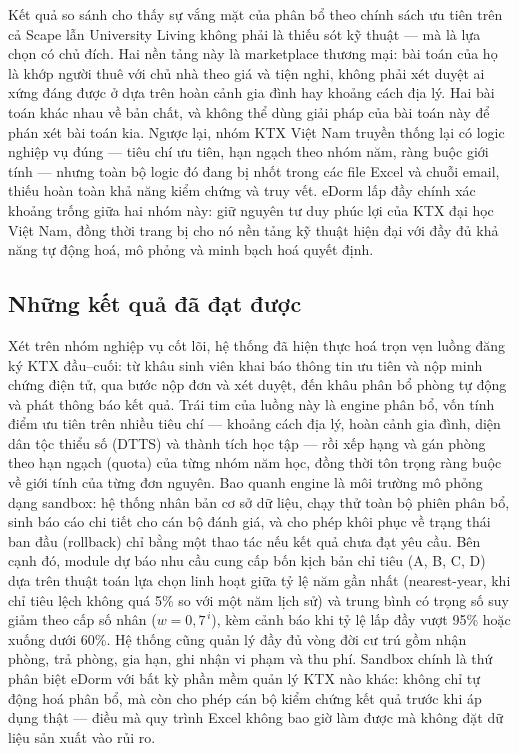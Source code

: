 \documentclass[../DoAn.tex]{subfiles}
\begin{document}
Kết quả so sánh cho thấy sự vắng mặt của phân bổ theo chính sách ưu tiên trên
cả Scape lẫn University Living không phải là thiếu sót kỹ thuật --- mà là lựa
chọn có chủ đích. Hai nền tảng này là marketplace thương mại: bài toán của họ
là khớp người thuê với chủ nhà theo giá và tiện nghi, không phải xét duyệt
ai xứng đáng được ở dựa trên hoàn cảnh gia đình hay khoảng cách địa lý. Hai bài
toán khác nhau về bản chất, và không thể dùng giải pháp của bài toán này để phán
xét bài toán kia. Ngược lại, nhóm KTX Việt Nam truyền thống lại có logic nghiệp
vụ đúng --- tiêu chí ưu tiên, hạn ngạch theo nhóm năm, ràng buộc giới tính ---
nhưng toàn bộ logic đó đang bị nhốt trong các file Excel và chuỗi email, thiếu
hoàn toàn khả năng kiểm chứng và truy vết. eDorm lấp đầy chính xác khoảng
trống giữa hai nhóm này: giữ nguyên tư duy phúc lợi của KTX đại học Việt Nam,
đồng thời trang bị cho nó nền tảng kỹ thuật hiện đại với đầy đủ khả năng tự
động hoá, mô phỏng và minh bạch hoá quyết định.

\subsection{Những kết quả đã đạt được}
\label{subsection:6.1.2}

Xét trên nhóm nghiệp vụ cốt lõi, hệ thống đã hiện thực hoá trọn vẹn luồng
đăng ký KTX đầu--cuối: từ khâu sinh viên khai báo thông tin ưu tiên và nộp
minh chứng điện tử, qua bước nộp đơn và xét duyệt, đến khâu phân bổ phòng tự
động và phát thông báo kết quả. Trái tim của luồng này là engine phân bổ, vốn
tính điểm ưu tiên trên nhiều tiêu chí --- khoảng cách địa lý, hoàn cảnh gia
đình, diện dân tộc thiểu số (DTTS) và thành tích học tập --- rồi xếp hạng và
gán phòng theo hạn ngạch (quota) của từng nhóm năm học, đồng thời tôn trọng
ràng buộc về giới tính của từng đơn nguyên. Bao quanh engine là môi trường mô
phỏng dạng sandbox: hệ thống nhân bản cơ sở dữ liệu, chạy thử toàn bộ phiên
phân bổ, sinh báo cáo chi tiết cho cán bộ đánh giá, và cho phép khôi phục về
trạng thái ban đầu (rollback) chỉ bằng một thao tác nếu kết quả chưa đạt yêu
cầu. Bên cạnh đó, module dự báo nhu cầu cung cấp bốn kịch bản chỉ tiêu (A, B,
C, D) dựa trên thuật toán lựa chọn linh hoạt giữa tỷ lệ năm gần nhất
(nearest-year, khi chỉ tiêu lệch không quá 5\% so với một năm lịch sử) và
trung bình có trọng số suy giảm theo cấp số nhân ($w = 0{,}7^{\,i}$), kèm
cảnh báo khi tỷ lệ lấp đầy vượt 95\% hoặc xuống dưới 60\%. Hệ thống cũng
quản lý đầy đủ vòng đời cư trú gồm nhận phòng, trả phòng, gia hạn, ghi nhận
vi phạm và thu phí. Sandbox chính là thứ phân biệt eDorm với bất kỳ phần mềm
quản lý KTX nào khác: không chỉ tự động hoá phân bổ, mà còn cho phép cán bộ
kiểm chứng kết quả trước khi áp dụng thật --- điều mà quy trình Excel không bao
giờ làm được mà không đặt dữ liệu sản xuất vào rủi ro.
\end{document}
